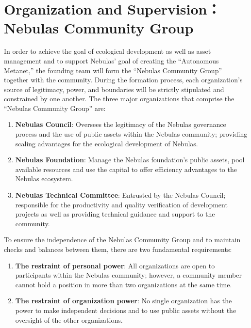 \section{Organization and Supervision： Nebulas Community Group}

In order to achieve the goal of ecological development as well as asset management and to support Nebulas’ goal of creating the “Autonomous Metanet,” the founding team will form the “Nebulas Community Group” together with the community. During the formation process, each organization’s source of legitimacy, power, and boundaries will be strictly stipulated and constrained by one another. The three major organizations that comprise the “Nebulas Community Group” are:

\begin{enumerate}
	\item \textbf{Nebulas Council}: Oversees the legitimacy of the Nebulas governance process and the use of public assets within the Nebulas community; providing scaling advantages for the ecological development of Nebulas.
	\item \textbf{Nebulas Foundation}: Manage the Nebulas foundation’s public assets, pool available resources and use the capital to offer efficiency advantages to the Nebulas ecosystem.
	\item \textbf{Nebulas Technical Committee}: Entrusted by the Nebulas Council; responsible for the productivity and quality verification of development projects as well as providing technical guidance and support to the community.
\end{enumerate}

\vspace{2em}

To ensure the independence of the Nebulas Community Group and to maintain checks and balances between them, there are two fundamental requirements:

\begin{enumerate}
	\item \textbf{The restraint of personal power}: All organizations are open to participants within the Nebulas community; however, a community member cannot hold a position in more than two organizations at the same time.
	\item \textbf{The restraint of organization power}: No single organization has the power to make independent decisions and to use public assets without the oversight of the other organizations.
\end{enumerate}

